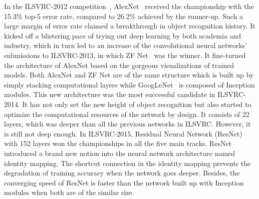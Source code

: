 In the ILSVRC-2012 competition~\parencite{RN205}, AlexNet~\parencite{RN65}
received the championship with the 15.3\% top-5 error rate, compared to
26.2\% achieved by the runner-up.
Such a large margin of error rate claimed a breakthrough in
object recognition history.
It kicked off a blistering pace of trying out deep learning by both academia
and industry, which in turn led to an increase of the convolutional
neural networks' submissions to ILSVRC-2013, in which ZF Net~\parencite{RN66}
was the winner.
It fine-turned the architecture of AlexNet based on the
gorgeous visualizations of trained models.
Both AlexNet and ZF Net are of the same structure which is built up
by simply stacking computational layers while GoogLeNet~\parencite{RN60}
is composed of Inception
modules.
This new architecture was the most successful candidate in ILSVRC-2014.
It has not only set the new height of object recognition but also started to
optimize the computational resources of the network by design.
It consists of 22 layers, which was deeper than all the previous
networks in ILSVRC\@.
However, it is still not deep enough.
In ILSVRC-2015, Residual Neural Network (ResNet)~\parencite{RN67} with
152 layers won the championships in all the five main tracks.
ResNet introduced a brand new notion into the neural network architecture
named identity mapping.
The shortcut connection in the identity mapping prevents the degradation of
training accuracy when the network goes deeper.
Besides, the converging speed of ResNet is faster than the network built up
with Inception modules when both are of the similar size.

